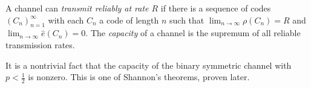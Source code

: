 \begin{definition}
    A channel can \emph{transmit reliably at rate \( R \)} if there is a sequence of codes \( (C_n)_{n=1}^\infty \) with each \( C_n \) a code of length \( n \) such that \( \lim_{n \to \infty} \rho(C_n) = R \) and \( \lim_{n \to \infty} \hat e(C_n) = 0 \).
    The \emph{capacity} of a channel is the supremum of all reliable transmission rates.
\end{definition}
It is a nontrivial fact that the capacity of the binary symmetric channel with \( p < \frac{1}{2} \) is nonzero.
This is one of Shannon's theorems, proven later.
